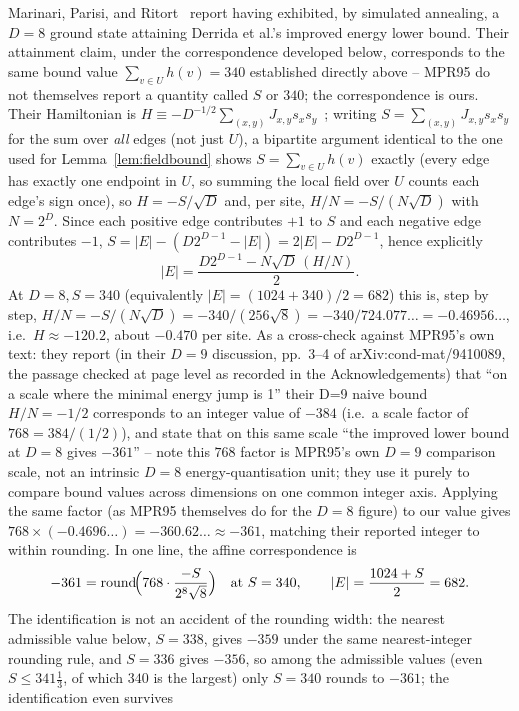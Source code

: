\documentclass[12pt,a4paper]{article}
\theoremstyle{definition}
\begin{document}
Marinari, Parisi, and Ritort~\cite{MPR95} report having exhibited, by
simulated annealing, a $D=8$ ground state attaining Derrida et
al.'s improved energy lower bound. Their attainment claim, under the
correspondence developed below, corresponds to the same bound value
$\sum_{v\in U}h(v)=340$ established directly above -- MPR95 do not
themselves report a quantity called $S$ or $340$; the correspondence is
ours. Their Hamiltonian is
$H\equiv-D^{-1/2}\sum_{(x,y)}J_{x,y}s_xs_y$~\cite[Eq.~3]{MPR95}; writing
$S=\sum_{(x,y)}J_{x,y}s_xs_y$ for the sum over \emph{all} edges (not
just $U$), a bipartite argument identical to the one used for
Lemma~\ref{lem:fieldbound} shows $S=\sum_{v\in U}h(v)$ exactly (every
edge has exactly one endpoint in $U$, so summing the local field over
$U$ counts each edge's sign once), so $H=-S/\sqrt D$ and, per site,
$H/N=-S/(N\sqrt D)$ with $N=2^D$. Since each positive edge contributes
$+1$ to $S$ and each negative edge contributes $-1$,
$S=|E|-(D2^{D-1}-|E|)=2|E|-D2^{D-1}$, hence explicitly
\[
  |E|=\frac{D2^{D-1}-N\sqrt D\,(H/N)}{2}.
\]
At $D=8,S=340$ (equivalently $|E|=(1024+340)/2=682$) this is, step by
step, $H/N=-S/(N\sqrt D)=-340/(256\sqrt8)=-340/724.077\ldots
=-0.46956\ldots$, i.e.\ $H\approx-120.2$, about $-0.470$ per site. As a cross-check
against MPR95's own text: they report (in their $D{=}9$ discussion, pp.~3--4 of
arXiv:cond-mat/9410089, the passage checked at page level as recorded in
the Acknowledgements) that
``on a scale where the minimal energy jump is 1'' their D=9 naive
bound $H/N=-1/2$ corresponds to an integer value of $-384$ (i.e.\ a
scale factor of $768=384/(1/2)$), and state that on this same scale
``the improved lower bound at $D=8$ gives $-361$'' -- note this $768$
factor is MPR95's own $D{=}9$ comparison scale, not an intrinsic
$D{=}8$ energy-quantisation unit; they use it purely to compare bound
values across dimensions on one common integer axis. Applying the same
factor (as MPR95 themselves do for the $D=8$ figure) to our value gives $768\times(-0.4696\ldots)=-360.62\ldots
\approx-361$, matching their reported integer to within rounding. In one
line, the affine correspondence is
\[
-361=\operatorname{round}\!\Bigl(768\cdot\frac{-S}{2^{8}\sqrt8}\Bigr)
\quad\text{at }S=340,
\qquad
|E|=\frac{1024+S}{2}=682 .
\] The
identification is not an accident of the rounding width: the nearest
admissible value below, $S=338$, gives $-359$ under the same
nearest-integer rounding rule, and $S=336$ gives $-356$, so among the
admissible values (even $S\le341\tfrac13$, of which $340$ is the
largest) only $S=340$ rounds to $-361$; the identification even survives
\end{document}

